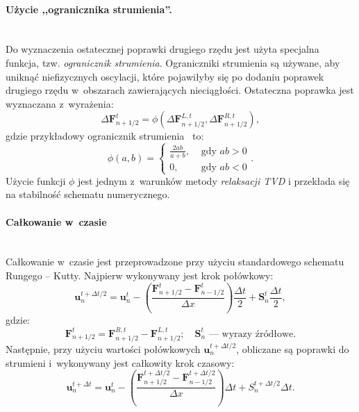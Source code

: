 \paragraph{Użycie ,,ogranicznika strumienia''.}~\\
Do wyznaczenia ostatecznej poprawki drugiego rzędu jest użyta specjalna funkcja,
tzw. \emph{ogranicznik strumienia}. Ograniczniki strumienia są używane, aby
uniknąć niefizycznych oscylacji, które pojawiłyby się po dodaniu poprawek
drugiego rzędu w~obszarach zawierających nieciągłości.  Ostateczna poprawka jest
wyznaczana z~wyrażenia:
%
\begin{equation}
   \Delta \mathbf{F}^{t}_{n+1/2} = \phi\left(\Delta
   \mathbf{F}^{L,t}_{n+1/2},\Delta \mathbf{F}^{R,t}_{n+1/2} \right),
\end{equation}
%
gdzie przykładowy ogranicznik strumienia~\cite{leer} to:
%
\begin{equation}
   \phi(a,b) = 
   \begin{cases}
      \frac{2ab}{a+b}, & \textrm{ gdy }ab>0 \\
      0, & \textrm{ gdy }ab<0
   \end{cases}.
\end{equation}
%
Użycie funkcji $\phi$ jest jednym z~warunków metody \emph{relaksacji TVD} i
przekłada się na stabilność schematu numerycznego.

\paragraph{Całkowanie w~czasie}~\\
Całkowanie w~czasie jest przeprowadzone przy użyciu standardowego schematu
Rungego -- Kutty. Najpierw wykonywany jest krok połówkowy:
%
\begin{equation}
   \mathbf{u}^{t+\Delta t/2}_{n} = \mathbf{u}^{t}_{n} -
   \left(\frac{\mathbf{F}^t_{n+1/2} - \mathbf{F}^t_{n-1/2}}{\Delta x}
   \right)\frac{\Delta t}{2} + \mathbf{S}_n^t \frac{\Delta t}{2},
\end{equation}
%
gdzie:
%
\begin{equation}
   \mathbf{F}^{t}_{n+1/2} = \mathbf{F}^{R,t}_{n+1/2} -
   \mathbf{F}^{L,t}_{n+1/2};\quad \mathbf{S}_n^t\textrm{ --- wyrazy źródłowe}.
\end{equation}
%
Następnie, przy użyciu wartości połówkowych $\mathbf{u}^{t+\Delta t/2}_{n}$,
obliczane są poprawki do strumieni i~wykonywany jest całkowity krok czasowy:
%
\begin{equation}
   \mathbf{u}^{t+\Delta t}_{n} = \mathbf{u}^{t}_{n} -
   \left(\frac{\mathbf{F}^{t+\Delta t/2}_{n+1/2} - \mathbf{F}^{t+\Delta
   t/2}_{n-1/2}}{\Delta x} \right)\Delta t + S_n^{t+\Delta t/2}\Delta t.
\end{equation}
%
%
